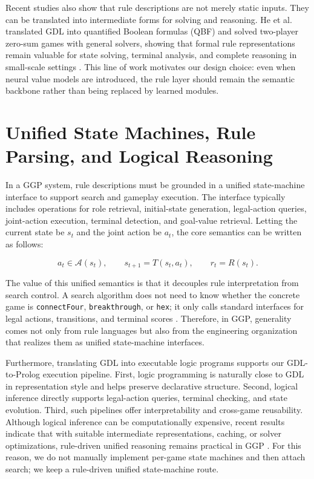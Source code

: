Recent studies also show that rule descriptions are not merely static inputs. They can be translated into intermediate forms for solving and reasoning. He et al. translated GDL into quantified Boolean formulas (QBF) and solved two-player zero-sum games with general solvers, showing that formal rule representations remain valuable for state solving, terminal analysis, and complete reasoning in small-scale settings \cite{he2024qbf}. This line of work motivates our design choice: even when neural value models are introduced, the rule layer should remain the semantic backbone rather than being replaced by learned modules.

\section{Unified State Machines, Rule Parsing, and Logical Reasoning}

In a GGP system, rule descriptions must be grounded in a unified state-machine interface to support search and gameplay execution. The interface typically includes operations for role retrieval, initial-state generation, legal-action queries, joint-action execution, terminal detection, and goal-value retrieval. Letting the current state be $s_t$ and the joint action be $a_t$, the core semantics can be written as follows:

\begin{equation}
a_t \in \mathcal{A}(s_t),\qquad
s_{t+1}=T(s_t,a_t),\qquad
r_t=R(s_t).
\end{equation}

The value of this unified semantics is that it decouples rule interpretation from search control. A search algorithm does not need to know whether the concrete game is \texttt{connectFour}, \texttt{breakthrough}, or \texttt{hex}; it only calls standard interfaces for legal actions, transitions, and terminal scores \cite{genesereth2005general}. Therefore, in GGP, generality comes not only from rule languages but also from the engineering organization that realizes them as unified state-machine interfaces.

Furthermore, translating GDL into executable logic programs supports our GDL-to-Prolog execution pipeline. First, logic programming is naturally close to GDL in representation style and helps preserve declarative structure. Second, logical inference directly supports legal-action queries, terminal checking, and state evolution. Third, such pipelines offer interpretability and cross-game reusability. Although logical inference can be computationally expensive, recent results indicate that with suitable intermediate representations, caching, or solver optimizations, rule-driven unified reasoning remains practical in GGP \cite{he2024qbf}. For this reason, we do not manually implement per-game state machines and then attach search; we keep a rule-driven unified state-machine route.

